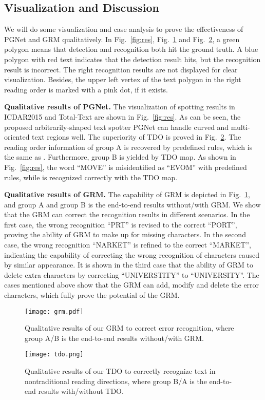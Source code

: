 \documentclass[letterpaper]{article} \usepackage{aaai21}  \usepackage{times}  \usepackage{helvet} \usepackage{courier}  \usepackage[hyphens]{url}  \usepackage{graphicx} \urlstyle{rm} \def\UrlFont{\rm}  \usepackage{natbib}  \usepackage{caption} \usepackage{bm}
\begin{document}
\subsection{Visualization and Discussion}
We will do some visualization and case analysis to prove the effectiveness of PGNet and GRM qualitatively. In Fig.~\ref{fig:res},  Fig.~\ref{fig:grm} and Fig.~\ref{fig:tdo}, a green polygon means that detection and recognition both hit the ground truth. A blue polygon with red text indicates that the detection result hits, but the recognition result is incorrect. The right recognition results are not displayed for clear visualization. Besides, the upper left vertex of the text polygon in the right reading order is marked with a pink dot, if it exists. 

\textbf{Qualitative results of PGNet.} The visualization of spotting results in ICDAR2015 and Total-Text are shown in Fig.~\ref{fig:res}. As can be seen, the proposed arbitrarily-shaped text spotter PGNet can handle curved and multi-oriented text regions well. The superiority of TDO is proved in Fig.~\ref{fig:tdo}. The reading order information of group A is recovered by predefined rules, which is the same as \cite{feng2019textdragon}. Furthermore, group B is yielded by TDO map. As shown in Fig.~\ref{fig:res}, the word ``MOVE'' is misidentified as ``EVOM'' with predefined rules, while is recognized correctly with the TDO map. 

\textbf{Qualitative results of GRM.} The capability of GRM is depicted in Fig.~\ref{fig:grm}, and group A and group B is the end-to-end results without/with GRM. We show that the GRM can correct the recognition results in different scenarios. In the first case, the wrong recognition ``PRT'' is revised to the correct ``PORT'', proving the ability of GRM to make up for missing characters. In the second case, the wrong recognition ``NARKET'' is refined to the correct ``MARKET'', indicating the capability of correcting the wrong recognition of characters caused by similar appearance. It is shown in the third case that the ability of GRM to delete extra characters by correcting ``UNIVERSTITY'' to ``UNIVERSITY''. The cases mentioned above show that the GRM can add, modify and delete the error characters, which fully prove the potential of the GRM.

\begin{figure}
    \centering
    \texttt{[image: grm.pdf]}
    \caption{Qualitative results of our GRM to correct error recognition, where group A/B is the end-to-end results without/with GRM.}
    \label{fig:grm}
\end{figure}


\begin{figure}
    \centering
    \texttt{[image: tdo.png]}
    \caption{Qualitative results of our TDO to correctly recognize text in nontraditional reading directions, where group B/A is the end-to-end results with/without TDO.}
    \label{fig:tdo}
\end{figure}



\end{document}

